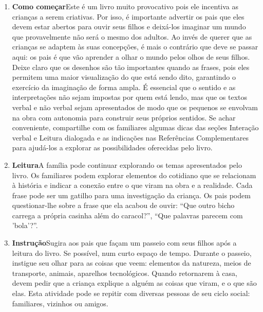 \documentclass[11pt]{extarticle}
\begin{document}


\begin{enumerate}
\item \textbf{Como começar}\quad Este é um livro muito provocativo 
pois ele incentiva as crianças a serem criativas. Por isso, é importante
advertir os pais que eles devem estar abertos para ouvir seus filhos
e deixá-los imaginar um mundo que provavelmente não será o mesmo dos adultos. 
Ao invés de querer que as crianças se adaptem às suas concepções, é mais o contrário
que deve se passar aqui: os pais é que vão aprender a olhar o mundo pelos olhos
de seus filhos. 
Deixe claro que os desenhos são tão importantes quando as frases, pois eles
permitem uma maior visualização do que está sendo dito, garantindo o exercício
da imaginação de forma ampla. 
É essencial que o sentido e as interpretações não sejam impostas por quem está lendo,
mas que os textos verbal e não verbal sejam apresentados de modo que os pequenos
se envolvam na obra com autonomia para construir seus próprios sentidos.
Se achar conveniente, compartilhe com 
os familiares algumas dicas das seções Interação verbal 
e Leitura dialogada e as indicações nas Referências Complementares 
para ajudá-los a explorar as possibilidades oferecidas pelo livro. 

\item \textbf{Leitura}\quad A família pode continuar 
explorando os temas apresentados pelo livro. Os familiares podem explorar 
elementos do cotidiano que se relacionam à história e indicar a conexão 
entre o que viram na obra e a realidade. Cada frase pode ser um gatilho para
uma investigação da criança. Os pais podem questionar-lhe sobre a frase que
ela acabou de ouvir: ``Que outro bicho carrega a própria casinha além do caracol?'',
``Que palavras parecem com 'bola'?''. 

\item \textbf{Instrução}\quad Sugira aos pais que façam um passeio com 
seus filhos após a leitura do livro. Se possível, num curto espaço de tempo. 
Durante o passeio, instigue seu olhar para as coisas que veem: elementos da natureza,
meios de transporte, animais, aparelhos tecnológicos. 
Quando retornarem à casa, devem pedir que a criança explique a alguém as coisas 
que viram, e o que são elas. Esta atividade pode se repitir com diversas pessoas de seu ciclo
social: familiares, vizinhos ou amigos. 
\end{enumerate}
\end{document}
